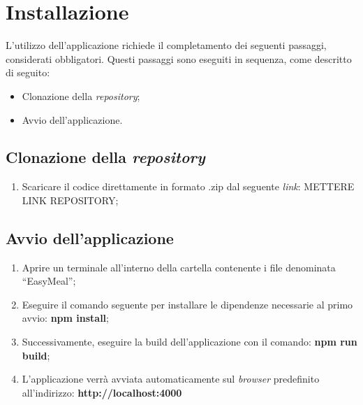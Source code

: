\section{Installazione}

L'utilizzo dell'applicazione richiede il completamento dei seguenti passaggi, considerati obbligatori. Questi passaggi sono eseguiti in sequenza, come descritto di seguito:
\begin{itemize}
    \item Clonazione della \textit{repository};
    \item Avvio dell'applicazione.
\end{itemize}

\subsection{Clonazione della \textit{repository}}

\begin{enumerate}
    \item Scaricare il codice direttamente in formato .zip dal seguente \textit{link}: METTERE LINK REPOSITORY;
\end{enumerate}

\subsection{Avvio dell'applicazione}
\begin{enumerate}
    \item Aprire un terminale all'interno della cartella contenente i file denominata “EasyMeal”;
    \item Eseguire il comando seguente per installare le dipendenze necessarie al primo avvio: \textbf{npm install};
    \item Successivamente, eseguire la build dell'applicazione con il comando: \textbf{npm run build};
    \item L'applicazione verrà avviata automaticamente sul \textit{browser} predefinito all'indirizzo: \textbf{http://localhost:4000}
\end{enumerate}